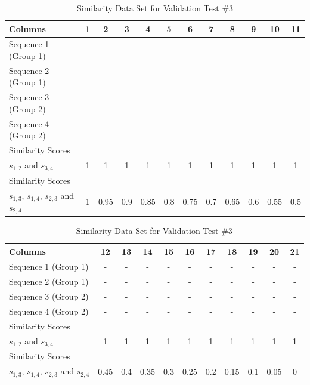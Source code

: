 \begin{table}[htb]
\caption{Similarity Data Set for Validation Test \#3}\label{tab:test_3}\centering\small
\begin{tabular}{lccccccccccc} \toprule
  Columns                     & 1   & 2    & 3   & 4    & 5   & 6    & 7   & 8    & 9   & 10   & 11  \\ \hline
  Sequence 1 (Group 1)        & -   & -    & -   & -    & -   & -    & -   & -    & -   & -    & -   \\
  Sequence 2 (Group 1)        & -   & -    & -   & -    & -   & -    & -   & -    & -   & -    & -   \\
  Sequence 3 (Group 2)        & -   & -    & -   & -    & -   & -    & -   & -    & -   & -    & -   \\
  Sequence 4 (Group 2)        & -   & -    & -   & -    & -   & -    & -   & -    & -   & -    & -   \\
  Similarity Scores \\
  $s_{1,2}$ and $s_{3,4}$     & 1   & 1    & 1   & 1    & 1   & 1    & 1   & 1    & 1   & 1    & 1   \\
  Similarity Scores \\
  $s_{1,3}$, $s_{1,4}$, $s_{2,3}$ and $s_{2,4}$
                              & 1   & 0.95 & 0.9 & 0.85 & 0.8 & 0.75 & 0.7 & 0.65 & 0.6 & 0.55 & 0.5 \\ \bottomrule
\end{tabular}\vspace{4mm}
\begin{tabular}{lcccccccccc} \toprule
  Columns                     & 12   & 13  & 14   & 15  & 16   & 17  & 18   & 19  & 20   & 21 \\ \hline
  Sequence 1 (Group 1)        & -    & -   & -    & -   & -    & -   & -    & -   & -    & -  \\
  Sequence 2 (Group 1)        & -    & -   & -    & -   & -    & -   & -    & -   & -    & -  \\
  Sequence 3 (Group 2)        & -    & -   & -    & -   & -    & -   & -    & -   & -    & -  \\
  Sequence 4 (Group 2)        & -    & -   & -    & -   & -    & -   & -    & -   & -    & -  \\
  Similarity Scores \\
  $s_{1,2}$ and $s_{3,4}$     & 1    & 1   & 1    & 1   & 1    & 1   & 1    & 1   & 1    & 1  \\
  Similarity Scores \\
  $s_{1,3}$, $s_{1,4}$, $s_{2,3}$ and $s_{2,4}$
                              & 0.45 & 0.4 & 0.35 & 0.3 & 0.25 & 0.2 & 0.15 & 0.1 & 0.05 & 0  \\ \bottomrule
\end{tabular}
\end{table}

